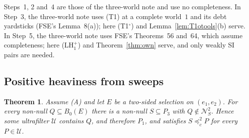 \documentclass[11pt]{article}
\newtheorem{theorem}{Theorem}
\theoremstyle{definition}\newtheorem{definition}[theorem]{Definition}
\theoremstyle{remark}\newtheorem{remark}[theorem]{Remark}
\newcommand{\Nid}{\mathcal N}
\newcommand{\Uf}{\mathcal U}
\newcommand{\To}{\textup{(T1$^\circ$)}}
\begin{document}
Steps~1, 2 and~4 are those of the three-world note and use no completeness.
In Step~3, the three-world note uses (T1) at a complete world~$1$ and its
debt yardsticks (FSE's Lemma~8(a)); here \To{} and
Lemma~\ref{lem:T1otools}(b) serve. In Step~5, the three-world note uses
FSE's Theorems~56 and~64, which assume completeness; here (LH$^+_1$) and
Theorem~\ref{thm:own} serve, and only weakly SI pairs are needed.

\subsection{Positive heaviness from sweeps}\label{sec:sweepheavy}

\begin{theorem}\label{thm:sweepheavy}
Assume (A) and let $E$ be a two-sided selection on $(e_1,e_2)$. For every
non-null $Q\subseteq B_0(E)$ there is a non-null $S\subseteq P_3$ with
$Q\notin\Nid^2_S$. Hence some ultrafilter $\Uf$ contains $Q$, and therefore
$P_1$, and satisfies $S\preceq^2_cP$ for every $P\in\Uf$.
\end{theorem}
\end{document}
